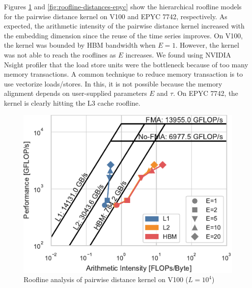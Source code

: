 \documentclass[sigconf]{acmart}
\begin{document}

Figures \ref{fig:roofline-distances-v100} and \ref{fig:roofline-distances-epyc}
show the hierarchical roofline models for the pairwise distance kernel on V100
and EPYC 7742, respectively. As expected, the arithmetic intensity of the
pairwise distance kernel increased with the embedding dimension since the
reuse of the time series improves. On V100, the kernel was bounded by HBM
bandwidth when $E=1$. However, the kernel was not able to reach the rooflines
as $E$ increases. We found using NVIDIA Nsight profiler that the load store
units were the bottleneck because of too many memory transactions. A common
technique to reduce memory transaction is to use vectorize loads/stores. In
this, it is not possible because the memory alignment depends on user-supplied
parameters $E$ and $\tau$. On EPYC 7742, the kernel is clearly hitting the L3
cache roofline.

\begin{figure}
    \centering
    \includegraphics{figs/roofline_distances_v100}
    \caption{Roofline analysis of pairwise distance kernel on V100 ($L=10^4$)}%
    \label{fig:roofline-distances-v100}
\end{figure}
\end{document}
